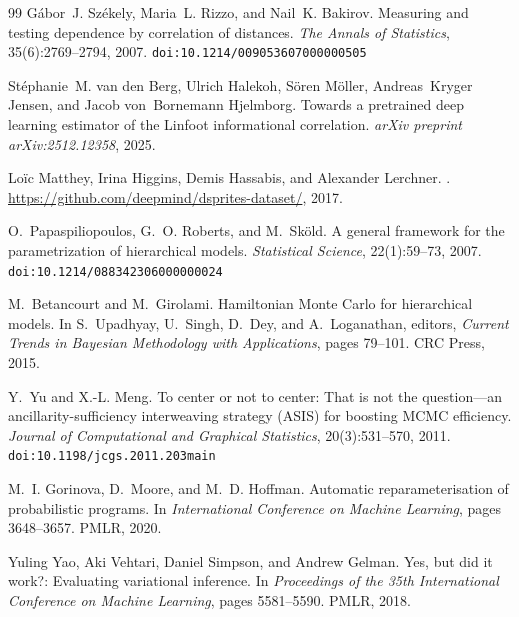 \documentclass[10pt]{article} %
\theoremstyle{plain}
\theoremstyle{definition}
\begin{document}
\begin{thebibliography}{99}
G{\'a}bor~J. Sz{\'e}kely, Maria~L. Rizzo, and Nail~K. Bakirov.
\newblock Measuring and testing dependence by correlation of distances.
\newblock \emph{The Annals of Statistics}, 35(6):2769--2794, 2007.
\newblock \texttt{doi:10.1214/009053607000000505}

St{\'e}phanie~M. van den Berg, Ulrich Halekoh, S{\"o}ren M{\"o}ller, Andreas~Kryger Jensen, and Jacob von~Bornemann Hjelmborg.
\newblock Towards a pretrained deep learning estimator of the {Linfoot} informational correlation.
\newblock \emph{arXiv preprint arXiv:2512.12358}, 2025.

Lo{\"i}c Matthey, Irina Higgins, Demis Hassabis, and Alexander Lerchner.
.
\newblock \url{https://github.com/deepmind/dsprites-dataset/}, 2017.

O.~Papaspiliopoulos, G.~O. Roberts, and M.~Sk\"{o}ld.
\newblock A general framework for the parametrization of hierarchical models.
\newblock \emph{Statistical Science}, 22(1):59--73, 2007.
\newblock \texttt{doi:10.1214/088342306000000024}

M.~Betancourt and M.~Girolami.
\newblock Hamiltonian {M}onte {C}arlo for hierarchical models.
\newblock In S.~Upadhyay, U.~Singh, D.~Dey, and A.~Loganathan, editors, \emph{Current Trends in Bayesian Methodology with Applications}, pages 79--101. CRC Press, 2015.

Y.~Yu and X.-L. Meng.
\newblock To center or not to center: That is not the question---an ancillarity-sufficiency interweaving strategy ({ASIS}) for boosting {MCMC} efficiency.
\newblock \emph{Journal of Computational and Graphical Statistics}, 20(3):531--570, 2011.
\newblock \texttt{doi:10.1198/jcgs.2011.203main}

M.~I. Gorinova, D.~Moore, and M.~D. Hoffman.
\newblock Automatic reparameterisation of probabilistic programs.
\newblock In \emph{International Conference on Machine Learning}, pages 3648--3657. PMLR, 2020.

Yuling Yao, Aki Vehtari, Daniel Simpson, and Andrew Gelman.
\newblock Yes, but did it work?: Evaluating variational inference.
\newblock In \emph{Proceedings of the 35th International Conference on Machine Learning}, pages 5581--5590. PMLR, 2018.


\end{thebibliography}
\end{document}
